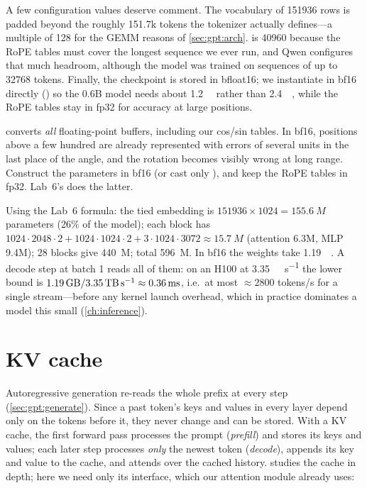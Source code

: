 A few configuration values deserve comment. The vocabulary of \num{151936} rows is padded beyond the
roughly \num{151.7}k tokens the tokenizer actually defines---a multiple of 128 for the GEMM reasons
of \cref{sec:gpt:arch}.  is \num{40960} because the RoPE tables must cover the
longest sequence we ever run, and Qwen configures that much headroom, although the model was trained on
sequences of up to \num{32768} tokens. Finally, the checkpoint is stored in bfloat16; we instantiate in
bf16 directly () so the 0.6B model needs about \SI{1.2}{\giga\byte} rather
than \SI{2.4}{\giga\byte}, while the RoPE tables stay in fp32 for accuracy at large positions.

\begin{pitfall}
 converts \emph{all} floating-point buffers, including our cos/sin
tables. In bf16, positions above a few hundred are already represented with errors of several units
in the last place of the angle, and the rotation becomes visibly wrong at long range. Construct the
parameters in bf16 (or cast only ), and keep the RoPE tables in fp32. Lab~6's
 does the latter.
\end{pitfall}

\begin{napkinmath}
Using the Lab~6 formula: the tied embedding is $\num{151936}\times1024=\SI{155.6}{M}$ parameters (26\% of
the model); each block has $1024\cdot2048\cdot2 + 1024\cdot1024\cdot2 + 3\cdot1024\cdot3072 \approx
\SI{15.7}{M}$ (attention 6.3M, MLP 9.4M); 28 blocks give \SI{440}{M}; total \SI{596}{M}. In bf16 the
weights take \SI{1.19}{\giga\byte}. A decode step at batch 1 reads all of them: on an H100 at
\SI{3.35}{\tera\byte\per\second} the lower bound is $\SI{1.19}{\giga\byte}/\SI{3.35}{\tera\byte\per\second}
\approx\SI{0.36}{\milli\second}$, i.e.\ at most $\approx\num{2800}$ tokens/s for a single stream---before
any kernel launch overhead, which in practice dominates a model this small (\cref{ch:inference}).
\end{napkinmath}

\section{KV cache}\label{sec:modern:kvcache}

Autoregressive generation re-reads the whole prefix at every step (\cref{sec:gpt:generate}). Since a
past token's keys and values in every layer depend only on the tokens before it, they never change and
can be stored. With a KV cache, the first forward pass processes the prompt (\emph{prefill}) and stores
its keys and values; each later step processes \emph{only} the newest token (\emph{decode}), appends
its key and value to the cache, and attends over the cached history.  studies the
cache in depth; here we need only its interface, which our attention module already uses:

